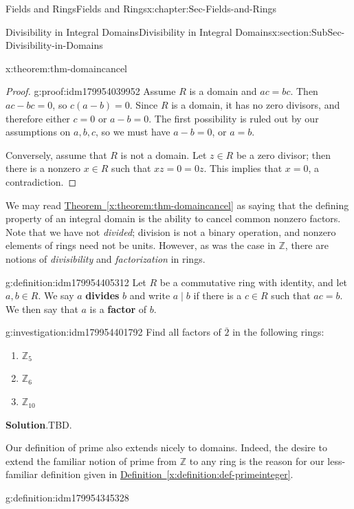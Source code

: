 \documentclass[oneside,10pt,]{book}
\newcommand{\blocktitlefont}{\relax}
\newcommand{\xreffont}{\relax}
\newcommand{\terminology}[1]{\textbf{#1}}
\numberwithin{equation}{section}
\def\Z{{\mathbb Z}}
\begin{document}
\begin{chapterptx}{Fields and Rings}{}{Fields and Rings}{}{}{x:chapter:Sec-Fields-and-Rings}
\begin{sectionptx}{Divisibility in Integral Domains}{}{Divisibility in Integral Domains}{}{}{x:section:SubSec-Divisibility-in-Domains}
\begin{theorem}{}{}{x:theorem:thm-domaincancel}
\end{theorem}
\begin{proof}{}{g:proof:idm179954039952}
Assume \(R\) is a domain and \(ac = bc\). Then \(ac - bc = 0\), so \(c(a-b) = 0\). Since \(R\) is a domain, it has no zero divisors, and therefore either \(c = 0\) or \(a-b=0\). The first possibility is ruled out by our assumptions on \(a,b,c\), so we must have \(a-b = 0\), or \(a =b\).%
\par
Conversely, assume that \(R\) is not a domain. Let \(z\in R\) be a zero divisor; then there is a nonzero \(x\in R\) such that \(xz = 0 = 0 z\). This implies that \(x = 0\), a contradiction.%
\end{proof}
We may read \hyperref[x:theorem:thm-domaincancel]{Theorem~{\xreffont\ref{x:theorem:thm-domaincancel}}} as saying that the defining property of an integral domain is the ability to cancel common nonzero factors. Note that we have not \emph{divided}; division is not a binary operation, and nonzero elements of rings need not be units. However, as was the case in \(\Z\), there are notions of \emph{divisibility} and \emph{factorization} in rings.%
\begin{definition}{}{g:definition:idm179954405312}%
%
%
Let \(R\) be a commutative ring with identity, and let \(a,b\in R\). We say \(a\) \terminology{divides} \(b\) and write \(a\mid b\) if there is a \(c\in R\) such that \(ac = b\). We then say that \(a\) is a \terminology{factor} of \(b\).%
\end{definition}
\begin{investigation}{}{g:investigation:idm179954401792}%
Find all factors of \(\overline{2}\) in the following rings:%
%
\begin{enumerate}
\item{}\(\displaystyle \Z_5\)%
\item{}\(\displaystyle \Z_6\)%
\item{}\(\displaystyle \Z_{10}\)%
\end{enumerate}
\par\smallskip%
\noindent\textbf{\blocktitlefont Solution}.\hypertarget{g:solution:idm179954364480}{}\quad{}TBD.%
\end{investigation}
Our definition of prime also extends nicely to domains. Indeed, the desire to extend the familiar notion of prime from \(\Z\) to any ring is the reason for our less-familiar definition given in \hyperref[x:definition:def-primeinteger]{Definition~{\xreffont\ref{x:definition:def-primeinteger}}}.%
\begin{definition}{}{g:definition:idm179954345328}%

\end{definition}
\end{sectionptx}
\end{chapterptx}
\end{document}
